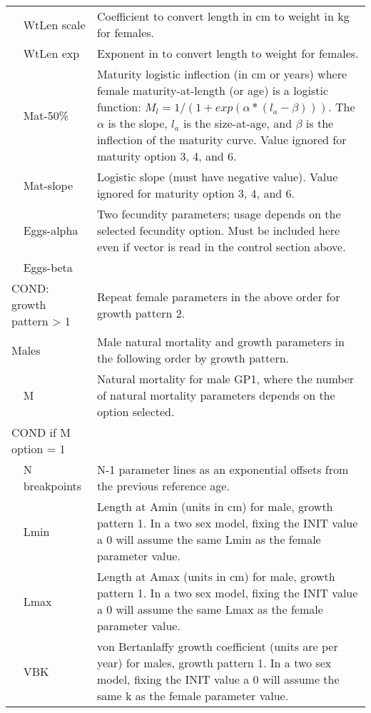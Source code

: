\begin{longtable}{p{1cm} p{2.25cm} p{10cm}}
	\Tstrut & WtLen scale & Coefficient to convert length in cm to weight in kg for females.\\
	& WtLen exp & Exponent in to convert length to weight for females.\\
	& Mat-50\% & Maturity logistic inflection (in cm or years) where female maturity-at-length (or age) is a logistic function: $M_{l} = 1/(1+exp(\alpha*(l_{a} - \beta)))$. The $\alpha$ is the slope, $l_{a}$ is the size-at-age, and $\beta$ is the inflection of the maturity curve. Value ignored for maturity option 3, 4, and 6. \\ 
	& Mat-slope & Logistic slope (must have negative value). Value ignored for maturity option 3, 4, and 6.\\
	& Eggs-alpha & Two fecundity parameters; usage depends on the selected fecundity option.  Must be included here even if vector is read in the control section above.\\
	& Eggs-beta & \Bstrut\\
	\hline

	\multicolumn{2}{l}{COND: growth pattern > 1} \Tstrut & Repeat female parameters in the above order for growth pattern 2.\Bstrut\\
	\hline

	\multicolumn{2}{l}{Males} \Tstrut & Male natural mortality and growth parameters in the following order by growth pattern. \Bstrut\\
	& M & Natural mortality for male GP1, where the number of natural mortality parameters depends on the option selected. \Bstrut\\
	\hline
	\multicolumn{2}{l}{COND if M option = 1 } & \Tstrut\\
	& N breakpoints & N-1 parameter lines as an exponential offsets from the previous reference age.\Bstrut\\
	\hline
		
	& Lmin & Length at Amin (units in cm) for male, growth pattern 1. In a two sex model, fixing the INIT value a 0 will assume the same Lmin as the female parameter value.\\
	& Lmax & Length at Amax (units in cm) for male, growth pattern 1. In a two sex model, fixing the INIT value a 0 will assume the same Lmax as the female parameter value.\ \\
	& VBK &  von Bertanlaffy growth coefficient (units are per year) for males, growth pattern 1. In a two sex model, fixing the INIT value a 0 will assume the same k as the female parameter value.\Bstrut\\
	\hline


\end{longtable}
